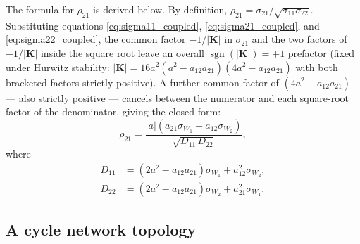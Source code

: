 \documentclass{article}
\begin{document}
The formula for $\rho_{21}$ is derived below. By definition,
$\rho_{21}=\sigma_{21}/\sqrt{\sigma_{11}\sigma_{22}}$. Substituting equations
\ref{eq:sigma11_coupled}, \ref{eq:sigma21_coupled}, and \ref{eq:sigma22_coupled}, the common
factor $-1/|\mathbf{K}|$ in $\sigma_{21}$ and the two factors of $-1/|\mathbf{K}|$ inside the
square root leave an overall $\operatorname{sgn}(|\mathbf{K}|)=+1$ prefactor (fixed under Hurwitz
stability: $|\mathbf{K}|=16a^2(a^2-a_{12}a_{21})(4a^2-a_{12}a_{21})$ with both bracketed factors
strictly positive). A further common factor of $(4a^2-a_{12}a_{21})$ — also strictly positive —
cancels between the numerator and each square-root factor of the denominator, giving the closed
form:
\begin{equation}
\rho_{21} = \frac{|a|\left(a_{21}\sigma_{W_1}+a_{12}\sigma_{W_2}\right)}{\sqrt{D_{11}\,D_{22}}},
\label{eq:rho21_coupled}
\end{equation}
where
\begin{align}
D_{11} &= \left(2a^2-a_{12}a_{21}\right)\sigma_{W_1} + a_{12}^2\sigma_{W_2}, \label{eq:D11_coupled}\\
D_{22} &= \left(2a^2-a_{12}a_{21}\right)\sigma_{W_2} + a_{21}^2\sigma_{W_1}. \label{eq:D22_coupled}
\end{align}

\subsection*{A cycle network topology}
\end{document}
